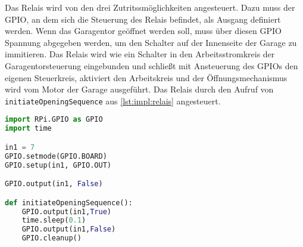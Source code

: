 Das Relais wird von den drei Zutritssmöglichkeiten angesteuert. Dazu muss der GPIO, an dem sich die Steuerung des Relais befindet, als Ausgang definiert werden. Wenn das Garagentor geöffnet werden soll, muss über diesen GPIO Spannung abgegeben werden, um den Schalter auf der Innenseite der Garage zu immitieren. Das Relais wird wie ein Schalter in den Arbeitsstromkreis der Garagentorsteuerung eingebunden und schließt mit Ansteuerung des GPIOs den eigenen Steuerkreis, aktiviert den Arbeitskreis und der Öffnungsmechanismus wird vom Motor der Garage ausgeführt. Das Relais durch den Aufruf von \verb|initiateOpeningSequence| aus \ref{lst:impl:relais} angesteuert.

\begin{lstlisting}[language=Python, caption=Ansteuerung des Relais, label=lst:impl:relais]
import RPi.GPIO as GPIO
import time

in1 = 7
GPIO.setmode(GPIO.BOARD)
GPIO.setup(in1, GPIO.OUT)

GPIO.output(in1, False)

def initiateOpeningSequence():
    GPIO.output(in1,True)
    time.sleep(0.1)
    GPIO.output(in1,False)
    GPIO.cleanup()
\end{lstlisting}